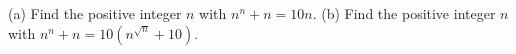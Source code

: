 (a) Find the positive integer $n$ with $n^n+n=10n$. (b) Find the positive integer $n$ with $n^n+n=10\left(n^{\sqrt n}+10\right)$.
